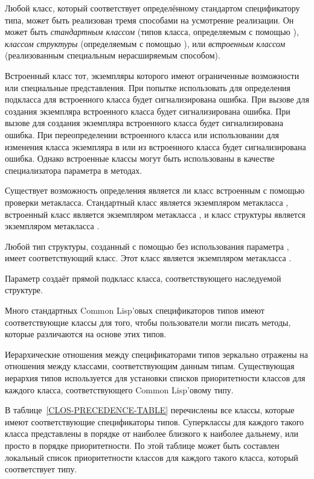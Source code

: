 Любой класс, который соответствует определённому стандартом спецификатору типа,
может быть реализован тремя способами на усмотрение реализации. Он может быть
\emph{стандартным классом} (типов класса, определяемым с помощью
), \emph{классом структуры} (определяемым с помощью
), или \emph{встроенным классом} (реализованным специальным
нерасширяемым способом).

Встроенный класс тот, экземпляры которого имеют ограниченные возможности или
специальные представления. При попытке использовать  для определения
подкласса для встроенного класса будет сигнализирована ошибка. При вызове
 для создания экземпляра встроенного класса будет
сигнализирована ошибка. При вызове
 для создания экземпляра встроенного класса будет
сигнализирована ошибка. 
При переопределении встроенного класса или использовании  для
изменения класса экземпляра в или из встроенного класса будет сигнализирована
ошибка.
Однако встроенные классы могут быть использованы в качестве специализатора
параметра в методах.

Существует возможность определения является ли класс встроенным с помощью
проверки метакласса. Стандартный класс является экземпляром метакласса
, встроенный класс является экземпляром метакласса
, и класс структуры является экземпляром метакласса
.

Любой тип структуры, созданный с помощью  без использования
параметра , имеет соответствующий класс. Этот класс является
экземпляром метакласса .

Параметр   создаёт прямой подкласс класса,
соответствующего наследуемой структуре.

Много стандартных Common Lisp'овых спецификаторов
типов имеют соответствующие классы для того, чтобы пользователи могли писать
методы, которые различаются на основе этих типов.

Иерархические отношения между спецификаторами типов зеркально отражены на
отношения между классами, соответствующим данным типам.
Существующая иерархия типов используется для установки списков приоритетности
классов для каждого класса, соответствующего Common Lisp'овому типу.

В таблице~\ref{CLOS-PRECEDENCE-TABLE} перечислены все классы, которые имеют
соответствующие спецификаторы типов. Суперклассы для каждого такого класса
представлены в порядке от наиболее близкого к наиболее дальнему, или просто в
порядке приоритетности. По этой таблице может быть составлен локальный
список приоритетности классов для каждого 
такого класса, который соответствует типу.

